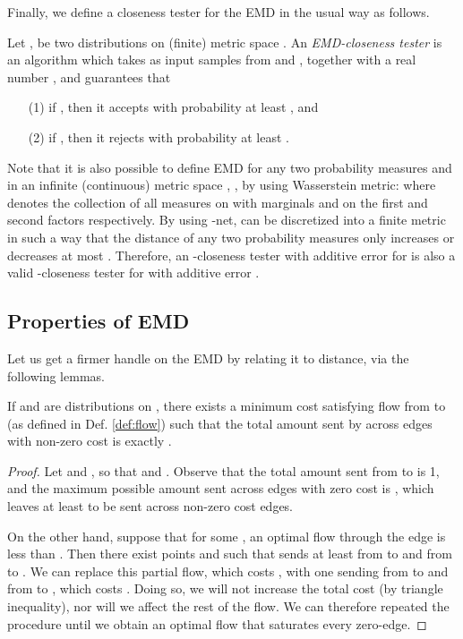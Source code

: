 \documentclass[11pt]{article}
\begin{document}
Finally, we define a closeness tester for the EMD in the usual way as follows.

\begin{definition}
  Let ,  be two distributions on (finite) metric space . An
  {\em EMD-closeness tester} is an algorithm which takes as input samples from  and ,
  together with a real number , and guarantees that
  \begin{itemize}
    \item[(1)] if , then it accepts with probability at least , and
    \item[(2)] if , then it rejects with probability at least .
  \end{itemize}
\end{definition}

Note that it is also possible to define EMD for any two probability measures  and  in an infinite (continuous) metric space , , by using Wasserstein metric:   where  denotes the collection of all measures on  with marginals  and  on the first and second factors respectively. By using -net,  can be discretized into a finite metric  in such a way that the  distance of any two probability measures only increases or decreases at most . Therefore, an -closeness tester with additive error  for  is also a valid -closeness tester for  with additive error .

\subsection{Properties of EMD}

Let us get a firmer handle on the EMD by relating it to  distance, via the
following lemmas.

\begin{lemma}\label{lem:L1/2}
        If  and  are distributions on , there exists a minimum cost
        satisfying flow  from  to  (as defined in Def. \ref{def:flow}) such that the total
        amount sent by  across edges with non-zero cost is exactly .
\end{lemma}

\begin{proof}
        Let  and , so that
         and . Observe that the total amount sent from  to
         is 1, and the maximum possible amount sent across edges with zero cost is , which
        leaves at least  to be sent across non-zero cost edges.
        
        On the other hand, suppose that for some , an optimal flow through the edge
         is less than .
        Then there exist points  and  such that  sends at least  from 
        to  and from  to . We can replace this partial flow, which costs
        , with one sending  from  to 
        and from  to , which costs . Doing so, we will not
        increase the total cost (by triangle inequality), nor will we affect the rest of the
        flow. We can therefore repeated the procedure until we obtain an optimal flow that
        saturates every zero-edge.
\end{proof}
\end{document}
